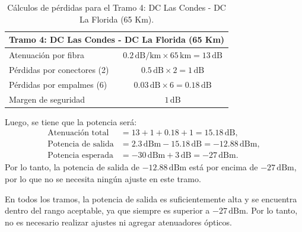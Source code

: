 \begin{itemize}
\begin{table}[H]
	\centering
	\renewcommand{\arraystretch}{1.5} %
	\begin{tabular}{|l|c|}
	\hline
	\multicolumn{2}{|c|}{\textbf{Tramo 4: DC Las Condes - DC La Florida (65 Km)}} \\ \hline
	Atenuación por fibra            & $0.2 \, \text{dB/km} \times 65 \, \text{km} = 13 \, \text{dB}$ \\ \hline
	Pérdidas por conectores (2)     & $0.5 \, \text{dB} \times 2 = 1 \, \text{dB}$                    \\ \hline
	Pérdidas por empalmes (6)       & $0.03 \, \text{dB} \times 6 = 0.18 \, \text{dB}$                \\ \hline
	Margen de seguridad             & $1 \, \text{dB}$                                               \\ \hline
	\end{tabular}
	\caption{Cálculos de pérdidas para el Tramo 4: DC Las Condes - DC La Florida (65 Km).}
	\label{tabla:tramo4}
\end{table}
Luego, se tiene que la potencia será:
\begin{align}
\text{Atenuación total} &= 13 + 1 + 0.18 + 1 = 15.18 \, \text{dB}, \\
\text{Potencia de salida} &= 2.3 \, \text{dBm} - 15.18 \, \text{dB} = -12.88 \, \text{dBm}, \\
\text{Potencia esperada} &= -30 \, \text{dBm} + 3 \, \text{dB} = -27 \, \text{dBm}.
\end{align}
Por lo tanto, la potencia de salida de \(-12.88 \, \text{dBm}\) está por encima de \(-27 \, \text{dBm}\), por lo que no se necesita ningún ajuste en este tramo.

En todos los tramos, la potencia de salida es suficientemente alta y se encuentra dentro del rango aceptable, ya que siempre es superior a \(-27 \, \text{dBm}\). Por lo tanto, no es necesario realizar ajustes ni agregar atenuadores ópticos.



\end{itemize}
